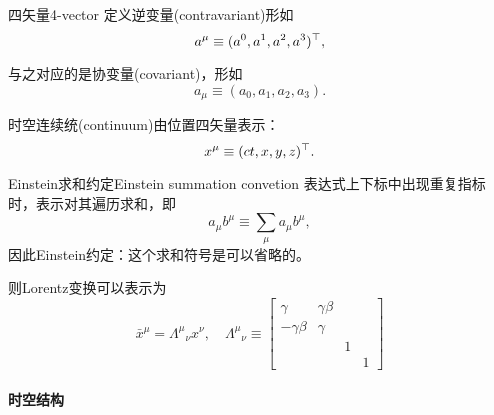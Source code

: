 \begin{definition}{四矢量}{4-vector}
    定义逆变量(contravariant)形如
    \begin{equation}
        a^\mu\equiv(a^0,a^1,a^2,a^3)^\top,
    \end{equation}

    与之对应的是协变量(covariant)，形如
    \begin{equation}
        a_\mu\equiv(a_0,a_1,a_2,a_3).
    \end{equation}
\end{definition}
时空连续统(continuum)由位置四矢量表示：
\begin{equation}
    x^\mu\equiv(ct,x,y,z)^\top.
\end{equation}
\begin{definition}{Einstein求和约定}{Einstein summation convetion}
    表达式上下标中出现重复指标时，表示对其遍历求和，即
    \begin{equation}
        a_\mu b^\mu\equiv\sum_\mu a_\mu b^\mu,
    \end{equation}
    因此Einstein约定：这个求和符号是可以省略的。
\end{definition}
则Lorentz变换可以表示为
\[
    \bar x^\mu=\Lambda^\mu{}_\nu x^\nu,\quad\Lambda^\mu{}_\nu\equiv
    \begin{bmatrix}
		\gamma&\gamma\beta\\-\gamma\beta&\gamma\\ &&1\\ &&&1
	\end{bmatrix}
\]

\paragraph{时空结构}

